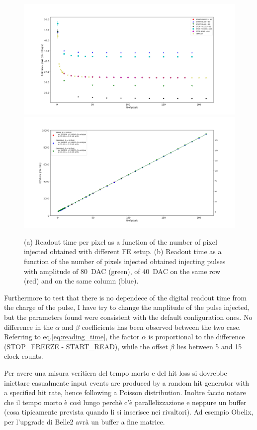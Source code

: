         \begin{figure}[h!]
            \centering
            \includegraphics[width=.9\linewidth]{figures/charaterization/parameters_points.png}
            \includegraphics[width=.9\linewidth]{figures/charaterization/default_line.png}
            \caption{(a) Readout time per pixel as a function of the number of pixel injected obtained with different FE setup. (b) Readout time as a function of the number of pixels injected obtained injecting pulses with amplitude of \SI{80}{DAC} (green), of \SI{40}{DAC} on the same row (red) and on the same column (blue).}
            \label{fig:dead_time}
        \end{figure}
        Furthermore to test that there is no dependece of the digital readout time from the charge of the pulse, I have try to change the amplitude of the pulse injected, but the parameters found were consistent with the default configuration ones.
        No difference in the $\alpha$ and $\beta$ coefficients has been observed between the two case.
        Referring to eq.\ref{eq:reading_time}, the factor $\alpha$ is proportional to the difference (STOP\_FREEZE - START\_READ), while the offset $\beta$ lies between 5 and 15 clock counts.

        Per avere una misura veritiera del tempo morto e del hit loss si dovrebbe iniettare casualmente input events are produced by a
        random hit generator with a specified hit rate, hence following a Poisson distribution. Inoltre faccio notare che il tempo morto è così lungo perchè c'è parallelizzazione e neppure un buffer (cosa tipicamente prevista quando li si inserisce nei rivaltori). Ad esempio Obelix, per l'upgrade di Belle2 avrà un buffer a fine matrice. 

